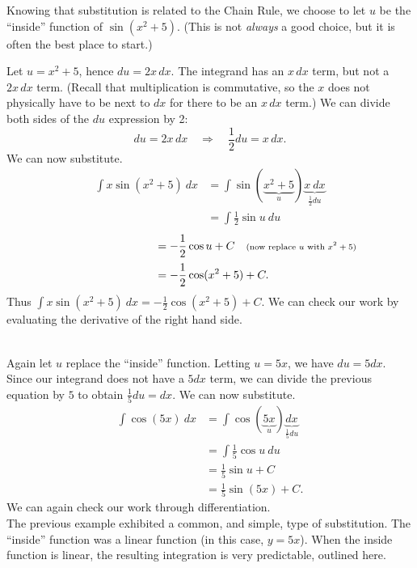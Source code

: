 {Knowing that substitution is related to the Chain Rule, we choose to let $u$ be the ``inside'' function of $\sin(x^2+5)$. (This is not \emph{always} a good choice, but it is often the best place to start.)

Let $u = x^2+5$, hence $du = 2x\,dx$. The integrand has an $x\,dx$ term, but not a $2x\,dx$ term. (Recall that multiplication is commutative, so the $x$ does not physically have to be next to $dx$ for there to be an $x\,dx$ term.) We can divide both sides of the $du$ expression by 2:
	$$du = 2x\,dx \quad \Rightarrow \quad \frac12du = x\,dx.$$ We can now substitute.
	\begin{align*}\int x\sin(x^2+5)\ dx &= \int \sin(\underbrace{x^2+5}_u) \underbrace{x\ dx}_{\frac12du}\\
						 &= \int \frac12\sin u\ du
\end{align*}
\begin{align*}
			\phantom{\int x\sin(x^2+5)\ dx} &= -\frac12\cos u + C \quad \text{\scriptsize (now replace $u$ with $x^2+5$)}\\
						 &=-\frac12\cos(x^2+5) + C.
	\end{align*}
Thus $\int x\sin(x^2+5)\ dx = -\frac12\cos(x^2+5)+C$. We can check our work by evaluating the derivative of the right hand side.
}\\

{Again let $u$ replace the ``inside'' function. Letting $u = 5x$, we have $du = 5dx$. Since our integrand does not have a $5dx$ term, we can divide the previous equation by $5$ to obtain $\frac15du = dx$. We can now substitute.
\begin{align*}
	\int \cos(5x)\ dx &= \int \cos(\underbrace{5x}_u) \underbrace{dx}_{\frac15du} \\
									&=	\int \frac15\cos u \ du \\
									&= \frac15\sin u + C \\
									&= \frac15\sin (5x)+C.
\end{align*}
We can again check our work through differentiation.
}\\

The previous example exhibited a common, and simple, type of substitution. The ``inside'' function was a linear function (in this case, $y = 5x$). When the inside function is linear, the resulting integration is very predictable, outlined here.

